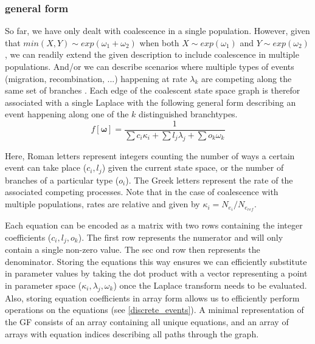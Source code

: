 \documentclass[10pt, a4]{article}
\begin{document}
\subsubsection{general form}
So far, we have only dealt with coalescence in a single population. However, 
given that $min(X, Y) \sim exp(\omega_1+\omega_2)$ when both $X \sim exp(\omega_1)$ and $Y \sim exp(\omega_2)$, we can readily extend the given description to include coalescence in multiple populations. And/or we can describe scenarios where multiple types of events (migration, recombination, ...) happening at rate $\lambda_k$ are competing along the same set of branches \citep{Lohse2011}. Each edge of the coalescent state space graph is therefor associated with a single Laplace with the following general form describing an event happening along one of the $k$ distinguished branchtypes. %
\begin{equation} \label{eq:general_form}
f[\boldsymbol{\omega}] = \frac{1}{\sum c_i\kappa_i + \sum l_j\lambda_j + \sum o_k \omega_k} 
\end{equation}

Here, Roman letters represent integers counting the number of ways a certain event can take place ($c_i, l_j$) given the current state space, or the number of branches of a particular type ($o_i$). The Greek letters represent the rate of the associated competing processes. Note that in the case of coalescence with multiple populations, rates are relative and given by $\kappa_i = N_{e_{i}}/N_{e_{ref}}$.

Each equation can be encoded as a matrix with two rows containing the integer coefficients ($c_i, l_j, o_k$). The first row represents the numerator and will only contain a single non-zero value. The sec ond row then represents the denominator. Storing the equations this way ensures we can efficiently substitute in parameter values by taking the dot product with a vector representing a point in parameter space ($\kappa_i, \lambda_j, \omega_k$) once the Laplace transform needs to be evaluated. Also, storing equation coefficients in array form allows us to efficiently perform operations on the equations (see \ref{discrete_events}). A minimal representation of the GF consists of an array containing all unique equations, and an array of arrays with equation indices describing all paths through the graph. 
\end{document}
